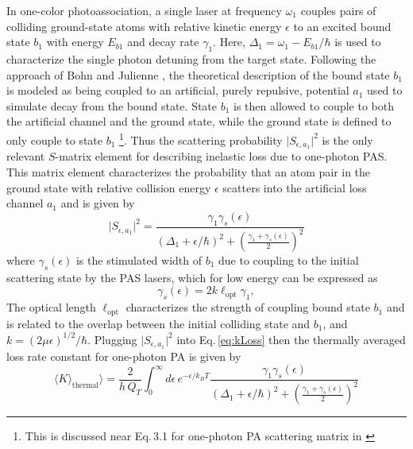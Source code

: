In one-color photoassociation, a single laser at frequency $\omega_1$ couples pairs of colliding ground-state atoms with relative kinetic energy $\epsilon$ to an excited bound state $b_1$ with energy $E_{b1}$ and decay rate $\gamma_1$.
Here, $\Delta_1 = \omega_1 - E_{b1}/\hbar$ is used to characterize the single photon detuning from the target state.
Following the approach of Bohn and Julienne \cite{Bohn1999}, the theoretical description of the bound state $b_1$ is modeled as being coupled to an artificial, purely repulsive, potential $a_1$ used to simulate decay from the bound state.
State $b_1$ is then allowed to couple to both the artificial channel and the ground state, while the ground state is defined to only couple to state $b_1$ \footnote{This is discussed near Eq.\,3.1 for one-photon PA scattering matrix in \cite{Bohn1999}}.
Thus the scattering probability $\vert S_{\epsilon, a_1} \vert^2$ is the only relevant $S$-matrix element for describing inelastic loss due to one-photon PAS.
This matrix element characterizes the probability that an atom pair in the ground state with relative collision energy $\epsilon$ scatters into the artificial loss channel $a_1$ and is given by
\begin{equation}
	\vert  S_{\epsilon, a_1} \vert^2 = \frac{\gamma_1 \gamma_s(\epsilon)}{(\Delta_1 + \epsilon/ \hbar)^2 + \left( \frac{\gamma_1 + \gamma_s(\epsilon)}{2} \right)^2}
\end{equation}
where ${\gamma}_{s}(\epsilon)$ is the stimulated width of $b_1$ due to coupling to the initial scattering state by the PAS lasers, which for low energy can be expressed as \cite{ctj06,Borkowski2014a,Pachomov2017,Pachomow2017a}
\begin{equation}\label{3equationstimulatedwidth}
	{\gamma}_{s}(\epsilon) = 2 k \ell_{\text{opt}} \gamma_1,
\end{equation}
The optical length $\ell_{\text{opt}}$ characterizes the strength of coupling bound state $b_1$ and is related to the overlap between the initial colliding state and $b_1$, and $k=(2\mu \epsilon)^{1/2}/\hbar$.
Plugging $\vert S_{\epsilon, a_1} \vert^2$ into Eq.\,\ref{eq:kLoss} then the thermally averaged loss rate constant for one-photon PA is given by
\begin{equation} \label{eq:onePhotonK}
	\langle K \rangle_\text{thermal} \rangle = \frac{2}{h\,Q_{T}} \int_{0}^{\infty} d\epsilon \,e^{-\epsilon/k_{B}T} \frac{\gamma_1 \gamma_s(\epsilon)}{(\Delta_1 + \epsilon/ \hbar)^2 + \left( \frac{\gamma_1 + \gamma_s(\epsilon)}{2} \right)^2} 
\end{equation}

